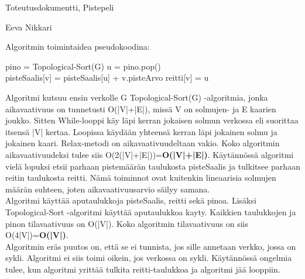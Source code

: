 \documentclass[12pt,a4paper,leqno]{amsart}
\begin{document}
\begin{flushleft}
				Toteutusdokumentti, Pistepeli
				\end{flushleft}				\begin{flushright}
				Eeva Nikkari
				\end{flushright}
				
				
Algoritmin toimintaidea pseudokoodina:
\begin{algorithm}
\begin{algorithmic}
	\State pino = Topological-Sort(G)
		\State u = pino.pop()
				\State {}
			\EndFor
	\EndWhile
\EndFunction
\\

\State pisteSaalis[v] = pisteSaalis[u] + v.pisteArvo
\State reitti[v] = u
\EndIf
\EndFunction
\end{algorithmic}
\end{algorithm}


Algoritmi kutsuu ensin verkolle G Topological-Sort(G) -algoritmia, jonka aikavaativuus on tunnetusti O(|V|+|E|), missä V on solmujen- ja E kaarien joukko. Sitten While-looppi käy läpi kerran jokaisen solmun verkossa eli suorittaa itsensä |V| kertaa. Loopissa käydään yhteensä kerran läpi jokainen solmu ja jokainen kaari. Relax-metodi on aikavaativuudeltaan vakio. Koko algoritmin aikavaativuudeksi tulee siis O(2(|V|+|E|))=\textbf{O(|V|+|E|)}. Käytännössä algoritmi vielä lopuksi etsii parhaan pistemäärän taulukosta pisteSaalis ja tulkitsee parhaan reitin taulukosta reitti. Nämä toiminnot ovat kuitenkin lineaarisia solmujen määrän suhteen, joten aikavaativuusarvio säilyy samana.\\

Algoritmi käyttää aputaulukkoja pisteSaalis, reitti sekä pinoa. Lisäksi Topological-Sort -algoritmi käyttää aputaulukkoa kayty. Kaikkien taulukkojen ja pinon tilavaativuus on O(|V|). Koko algoritmin tilavaativuus on siis O(4|V|)=\textbf{O(|V|)}.\\

Algoritmin eräs puutos on, että se ei tunnista, jos sille annetaan verkko, jossa on sykli. Algoritmi ei siis toimi oikein, jos verkossa on sykli. Käytännössä ongelmia tulee, kun algoritmi yrittää tulkita reitti-taulukkoa ja algoritmi jää looppiin.
\end{document}
